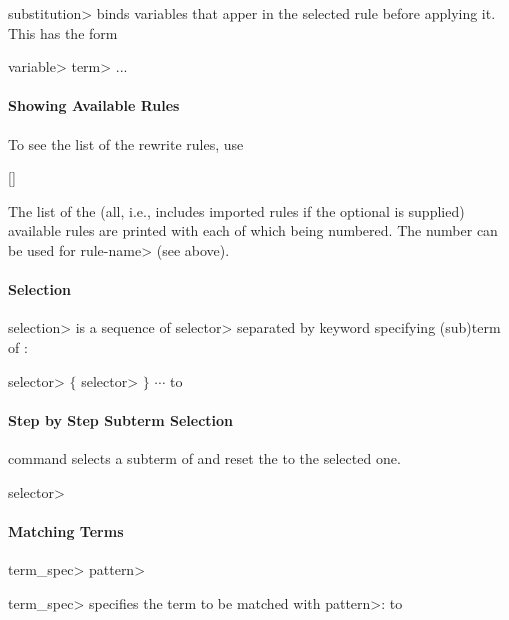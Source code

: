 \documentclass[a4paper,oneside,twocolumn]{memoir}
\begin{document}
\<substitution> binds variables that apper in the selected rule before 
applying it. This has the form

 \<variable> \kbd{=} \<term> \kbd{,} ...

\paragraph{Showing Available Rules}
To see the list of the rewrite rules, use

 [] 

The list of the (all, i.e., includes imported rules if the optional
 is supplied) available rules are printed with each of which
being numbered.  The number can be used for \<rule-name> (see above).

\paragraph{Selection}
\<selection> is a sequence of \<selector> separated by keyword
 specifying (sub)term of :

\<selector> $\{$  \<selector> $\}$ $\cdots$ 
\paralign to 

\paragraph{Step by Step Subterm Selection}
 command selects a subterm of  and reset
the  to the selected one.

 \<selector>

\paragraph{Matching Terms}

 \<term\_spec>  \<pattern>

\<term\_spec> specifies the term to be matched with \<pattern>:
\paralign to 
\end{document}
